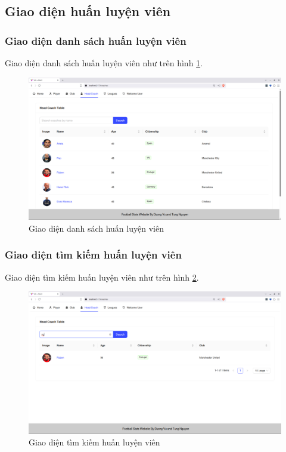 \documentclass[../BTL.tex]{subfiles}
\begin{document}
\subsection{ Giao diện huấn luyện viên}
\subsubsection{Giao diện danh sách huấn luyện viên}
Giao diện danh sách huấn luyện viên như trên hình \ref{fig:user-coach-list}.
\begin{figure}
\centering
\includegraphics[width=1\linewidth]{Hinhve/user-coach-list.png}
\caption{Giao diện danh sách huấn luyện viên}
\label{fig:user-coach-list}
\end{figure}


\subsubsection{Giao diện tìm kiếm huấn luyện viên}
Giao diện tìm kiếm huấn luyện viên như trên hình \ref{fig:user-coach-search}.
\begin{figure}
\centering
\includegraphics[width=1\linewidth]{Hinhve/user-coach-search.png}
\caption{Giao diện tìm kiếm huấn luyện viên}
\label{fig:user-coach-search}
\end{figure}
\end{document}
